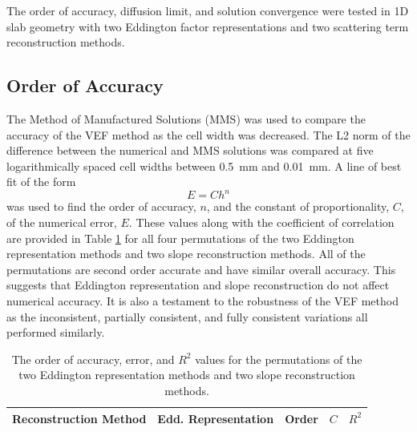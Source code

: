 
The order of accuracy, diffusion limit, and solution convergence were tested in 1D slab geometry with two Eddington factor representations and two scattering term reconstruction methods. 

\subsection{Order of Accuracy}
The Method of Manufactured Solutions (MMS) was used to compare the accuracy of the VEF method as the cell width was decreased. The L2 norm of the difference between the numerical and MMS solutions was compared at five logarithmically spaced cell widths between \SI{0.5}{mm} and \SI{0.01}{mm}. A line of best fit of the form 
	\begin{equation} 
		E = C h^n 
	\end{equation}
was used to find the order of accuracy, $n$, and the constant of proportionality, $C$, of the numerical error, $E$. These values along with the coefficient of correlation are provided in Table \ref{tab:mms} for all four permutations of the two Eddington representation methods and two slope reconstruction methods. All of the permutations are second order accurate and have similar overall accuracy. This suggests that Eddington representation and slope reconstruction do not affect numerical accuracy. It is also a testament to the robustness of the VEF method as the inconsistent, partially consistent, and fully consistent variations all performed similarly. 
	\begin{table}[!h] \centering
	\begin{tabular}{|c|c|c|c|c|}
	\hline
	\hline
	Reconstruction Method & Edd. Representation & Order & $C$ & $R^2$ \\ 
	\hline
		
	\hline
	\hline
	\end{tabular}
	\caption{The order of accuracy, error, and $R^2$ values for the permutations of the two Eddington representation methods and two slope reconstruction methods. }
	\label{tab:mms}
	\end{table}
	\afterpage{\clearpage}

